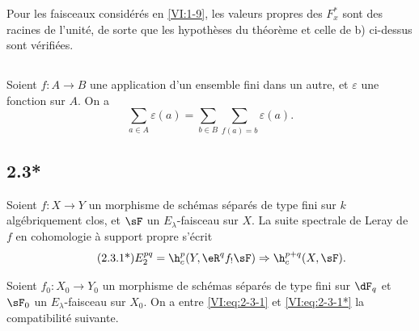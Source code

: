 Pour les faisceaux considérés en \ref{VI:1-9}, les valeurs propres des 
$F_x^\ast$ sont des racines de l'unité, de sorte que les hypothèses du 
théorème et celle de b) ci-dessus sont vérifiées. 





\subsection{}\label{VI:2-3}

Soient $f:A\to B$ une application d'un ensemble fini dans un autre, et 
$\varepsilon$ une fonction sur $A$. On a 
\begin{equation*}\tag{2.3.1}\label{VI:eq:2-3-1}
  \sum_{a\in A} \varepsilon(a) = \sum_{b\in B} \sum_{f(a)=b} \varepsilon(a) \text{.}
\end{equation*}






\subsection*{2.3*}\label{VI:2-3*}

Soient $f:X\to Y$ un morphisme de schémas séparés de type fini sur $k$ 
algébriquement clos, et $\sF$ un $E_\lambda$-faisceau sur $X$. La suite 
spectrale de Leray de $f$ en cohomologie à support propre s'écrit 
\begin{align*}\tag{2.3.1*}\label{VI:eq:2-3-1*}
  E_2^{p q} = \h_c^p(Y,\eR^q f_! \sF) \Rightarrow \h_c^{p+q}(X,\sF) \text{.}
\end{align*}

Soient $f_0:X_0 \to Y_0$ un morphisme de schémas séparés de type fini sur 
$\dF_q$ et $\sF_0$ un $E_\lambda$-faisceau sur $X_0$. On a entre 
\eqref{VI:eq:2-3-1} et \eqref{VI:eq:2-3-1*} la compatibilité suivante. 

